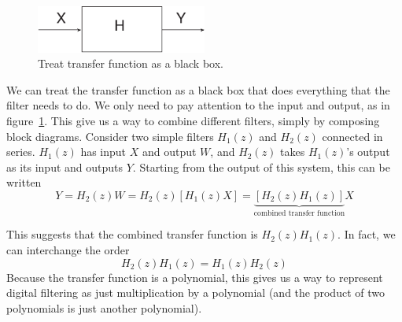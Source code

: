 \begin{figure}
\centerline{\includegraphics[width=0.5\textwidth]{ch-fir/ff-blackbox}}
\caption{Treat transfer function as a black box.
\label{fig:ff-blacbox}}
\end{figure}

We can treat the transfer function as a black box that does everything
that the filter needs to do. We only need to pay attention to the
input and output, as in figure~\ref{fig:ff-blacbox}.  This give us a
way to combine different filters, simply by composing block
diagrams. Consider two simple filters $H_1(z)$ and $H_2(z)$ connected
in series. $H_1(z)$ has input $X$ and output $W$, and $H_2(z)$ takes
$H_1(z)$'s output as its input and outputs $Y$. Starting from the
output of this system, this can be written
\begin{equation}
Y = H_2(z)W = H_2(z)[H_1(z)X]
  = \underbrace{[H_2(z)H_1(z)]}_{\text{combined transfer function}} X
\end{equation}

This suggests that the combined transfer function is
$H_2(z)H_1(z)$. In fact, we can interchange the order
\begin{equation}
H_2(z)H_1(z) = H_1(z)H_2(z)
\end{equation}
Because the transfer function is a polynomial, this gives us a way to
represent digital filtering as just multiplication by a polynomial
(and the product of two polynomials is just another polynomial).


